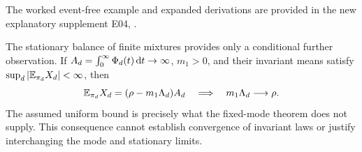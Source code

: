 The worked event-free example and expanded derivations are provided in the new explanatory supplement E04, .

The stationary balance of finite mixtures provides only a conditional further observation. If $A_d=\int_0^\infty\Phi_d(t)\mathop{}\!\mathrm{d} t\to\infty$, $m_1>0$, and their invariant means satisfy $\sup_d|\mathbb{E} _{\pi_d}X_d|<\infty$, then
\[
\mathbb{E} _{\pi_d}X_d=(\rho-m_1\Lambda_d)A_d
\quad\Longrightarrow\quad
m_1\Lambda_d\longrightarrow\rho.
\]
The assumed uniform bound is precisely what the fixed-mode theorem does not supply. This consequence cannot establish convergence of invariant laws or justify interchanging the mode and stationary limits.


